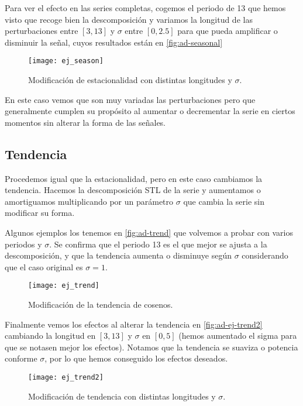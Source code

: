 Para ver el efecto en las series completas, cogemos el periodo de 13 que hemos visto que recoge bien la descomposición y variamos la longitud de las perturbaciones entre $[3, 13]$ y $\sigma$ entre $[0, 2.5]$ para que pueda amplificar o disminuir la señal, cuyos resultados están en \autoref{fig:ad-seasonal}

\begin{figure}[htpb]
  \centering
  \texttt{[image: ej\_season]}
  \caption{Modificación de estacionalidad con distintas longitudes y $\sigma$.}
  \label{fig:ad-seasonal}
\end{figure}

En este caso vemos que son muy variadas las perturbaciones pero que generalmente cumplen su propósito al aumentar o decrementar la serie en ciertos momentos sin alterar la forma de las señales.

\subsection{Tendencia}

Procedemos igual que la estacionalidad, pero en este caso cambiamos la tendencia. Hacemos la descomposición STL de la serie y aumentamos o amortiguamos multiplicando por un parámetro $\sigma$ que cambia la serie sin modificar su forma.

Algunos ejemplos los tenemos en \autoref{fig:ad-trend} que volvemos a probar con varios periodos y $\sigma$. Se confirma que el periodo 13 es el que mejor se ajusta a la descomposición, y que la tendencia aumenta o disminuye según $\sigma$ considerando que el caso original es $\sigma = 1$.

\begin{figure}[htpb]
  \centering
  \texttt{[image: ej\_trend]}
  \caption{Modificación de la tendencia de cosenos.}
  \label{fig:ad-trend}
\end{figure}

Finalmente vemos los efectos al alterar la tendencia en \autoref{fig:ad-ej-trend2} cambiando la longitud en $[3, 13]$ y $\sigma$ en $[0, 5]$ (hemos aumentado el sigma para que se notasen mejor los efectos). Notamos que la tendencia se suaviza o potencia conforme $\sigma$, por lo que hemos conseguido los efectos deseados.

\begin{figure}[htpb]
  \centering
  \texttt{[image: ej\_trend2]}
  \caption{Modificación de tendencia con distintas longitudes y $\sigma$.}
  \label{fig:ad-ej-trend2}
\end{figure}

